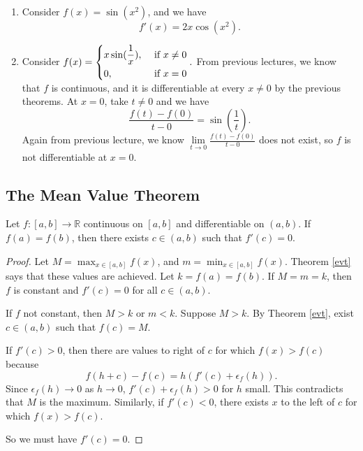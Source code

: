 \begin{example}
    \leavevmode
    \begin{enumerate}
        \item Consider \(f(x) = \sin (x^2)\), and we have
        \[
            f'(x) = 2x \cos (x^2).
        \]
        \item Consider \(f(x) = \begin{dcases}
            x \sin (\frac{1}{x}), &\text{ if }x\neq 0 \\
            0, &\text{ if }x=0 \\
        \end{dcases}.\) From previous lectures, we know that \(f\) is continuous, and it is differentiable at every \(x \neq 0\) by the previous theorems. At \(x = 0\), take \(t \neq 0\) and we have
        \[
            \frac{f(t) - f(0)}{t-0}= \sin(\frac{1}{t}).
        \]
        Again from previous lecture, we know \(\lim\limits_{t \to 0} \frac{f(t) - f(0)}{t-0}\) does not exist, so \(f\) is not differentiable at \(x = 0\).
    \end{enumerate}
\end{example}
\subsection{The Mean Value Theorem}
\leavevmode
\begin{theorem}
    Let \(f: [a,b] \to \mathbb{R}\) continuous on \([a,b]\) and differentiable on \((a,b)\). If \(f(a) = f(b)\), then there exists \(c \in (a,b)\) such that \(f'(c) = 0\).
\end{theorem}
\begin{proof}
    Let \(M = \mathop{\max}_{x \in [a,b]} f(x)\), and \(m = \mathop{\min}_{x \in [a,b]} f(x)\). Theorem \eqref{evt} says that these values are achieved. Let \(k = f(a) = f(b)\). If \(M = m = k\), then \(f\) is constant and \(f'(c) = 0\) for all \(c \in (a,b)\).

    If \(f\) not constant, then \(M > k\) or \(m < k\). Suppose \(M > k\). By Theorem \eqref{evt}, exist \(c \in (a,b)\) such that \(f(c) = M\).

    If \(f'(c) > 0\), then there are values to right of \(c\) for which \(f(x) > f(c)\) because
    \[f(h + c) - f(c) = h(f'(c) + \epsilon_f(h)).\]
    Since \(\epsilon_f(h) \to 0\) as \(h \to 0\), \(f'(c) + \epsilon_f(h) > 0\) for \(h\) small. This contradicts that \(M\) is the maximum. Similarly, if \(f'(c) < 0\), there exists \(x\) to the left of \(c\) for which \(f(x) > f(c)\).

    So we must have \(f'(c) = 0\).
\end{proof}